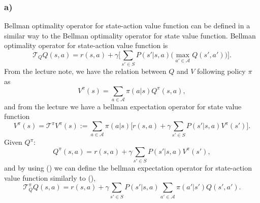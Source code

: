 \documentclass[12pt]{article}
\begin{document}
\subsubsection*{a)}
Bellman optimality operator for state-action value function can be defined in a similar way to the Bellman optimality operator for state value function. Bellman optimality operator for state-action value function is
\begin{equation}
    \mathcal{T}_QQ(s,a) = r(s,a) + \gamma\Big[\sum_{s'\in S}P(s'|s,a) \Big(\max_{a' \in \mathcal{A}}Q(s',a')\Big)\Big].
    \label{eq:bellmanoptimalityop}
\end{equation}
From the lecture note, we have the relation between $Q$ and $V$ following policy $\pi$ as
\begin{equation}
    V^\pi(s) = \sum_{a \in \mathcal{A}}\pi(a|s)Q^\pi(s,a), 
    \label{eq:qvrelation}
\end{equation}
and from the lecture we have a bellman expectation operator for state value function
\begin{equation}
    V^\pi(s) = \mathcal{T}^\pi V^\pi(s) := \sum_{a \in \mathcal{A}} \pi(a|s) \Big[r(s,a) + \gamma \sum_{s'\in S}P(s'|s,a)V^\pi(s') \Big].
    \label{eq:vpi}
\end{equation}
Given $Q^\pi$:
\begin{equation}
    Q^\pi(s,a) = r(s,a) + \gamma\sum_{s'\in S}P(s'|s,a)V^\pi(s'),
    \label{eq:qfun}
\end{equation}
and by using () we can define the bellman expectation operator for state-action value function similarly to (),
\begin{equation}
    \mathcal{T}^\pi_QQ(s,a) = r(s,a) + \gamma \sum_{s'\in S}P(s'|s,a)\sum_{a' \in \mathcal{A}}\pi(a'|s')Q(s',a').
    \label{eq:qbellmanexpect}
\end{equation}
\end{document}
